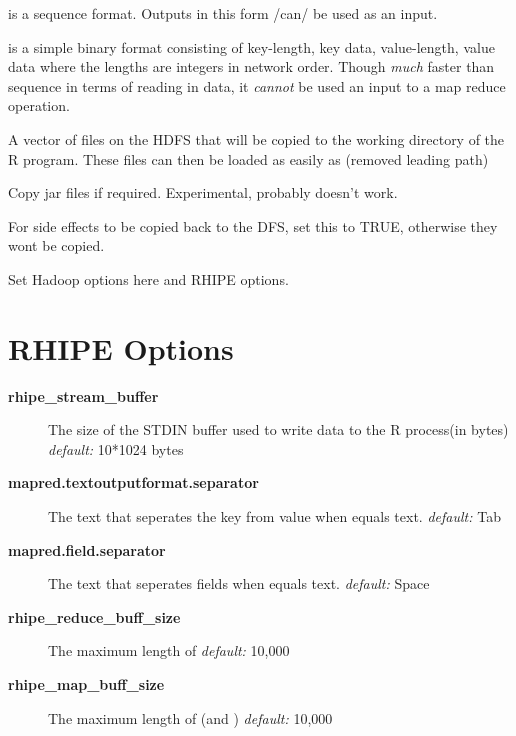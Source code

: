 \documentclass[letterpaper,10pt,english]{manual}
\begin{document}
\begin{description}
\begin{description}
\begin{description}
\end{description}

\item[\code{sequence}]
is a sequence format. Outputs in this form /can/ be used as an input.

\item[\code{binary}]
is a simple binary format consisting of key-length, key data, value-length, value data where the lengths are integers in network order. Though \emph{much} faster than sequence in terms of reading in data, it \emph{cannot} be used an input to a map reduce operation.

\end{description}

\item[\code{shared}]
A vector of files on the HDFS that will be copied to the working directory of the R program. These files can then be loaded as easily as  (removed leading path)

\item[\code{jarfiles}]
Copy jar files if required. Experimental, probably doesn't work.

\item[\code{copyFiles}]
For side effects to be copied back to the DFS, set this to TRUE, otherwise they wont be copied.

\item[\code{mapred}]
Set Hadoop options here and RHIPE options.

\end{description}


\section{RHIPE Options}
\begin{description}
\item[\textbf{rhipe\_stream\_buffer}]
The size of the STDIN buffer used to write data to the R process(in bytes)
\emph{default:} 10*1024 bytes

\item[\textbf{mapred.textoutputformat.separator}]
The text that seperates the key from value when  equals text.
\emph{default:} Tab

\item[\textbf{mapred.field.separator}]
The text that seperates fields when  equals text.
\emph{default:} Space

\item[\textbf{rhipe\_reduce\_buff\_size}]
The maximum length of 
\emph{default:} 10,000

\item[\textbf{rhipe\_map\_buff\_size}]
The maximum length of  (and )
\emph{default:} 10,000

\end{description}
\end{document}
